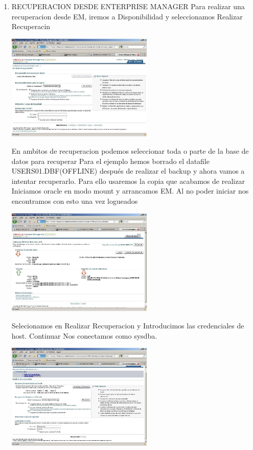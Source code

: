 \documentclass[a4paper,twocolumn,10pt]{article}
\begin{document}
\begin{enumerate}[4.1]
\item RECUPERACION DESDE ENTERPRISE MANAGER
Para realizar una recuperacion desde EM, iremos a Disponibilidad y seleccionamos Realizar Recuperacin
\begin{center}
\includegraphics[width=7cm]{./Imagenes/r1} 
\end{center}
En ambitos de recuperacion podemos seleccionar toda o parte de la base de datos para recuperar
Para el ejemplo hemos borrado el datafile USERS01.DBF(OFFLINE) después de realizar el backup y ahora vamos a intentar recuperarlo. Para ello usaremos la copia que acabamos de realizar Iniciamos oracle en modo mount y arrancamos EM. Al no poder iniciar nos encontramos con esto una vez logueados
\begin{center}
\includegraphics[width=7cm]{./Imagenes/r2} 
\end{center}
Selecionamos en Realizar Recuperacion y Introducimos las credenciales de host. Continuar Nos conectamos como sysdba.
\begin{center}
\includegraphics[width=7cm]{./Imagenes/r3} 

\end{center}
\end{enumerate}
\end{document}
